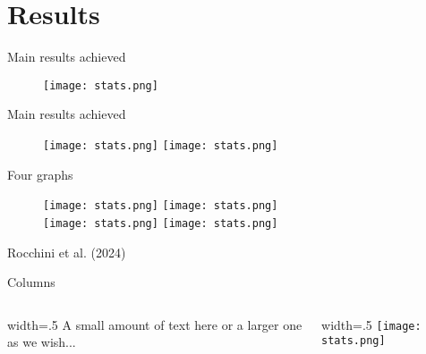 \documentclass{beamer}
\begin{document}
\section{Results}

\begin{frame}{Main results achieved}
    \begin{figure}
        \centering
        \texttt{[image: stats.png]}
        \label{fig:enter-label}
    \end{figure}
\end{frame}

\begin{frame}{Main results achieved}
    \begin{figure}
        \centering
        \texttt{[image: stats.png]}
        \texttt{[image: stats.png]}
    \end{figure}
\end{frame}

\begin{frame}{Four graphs}
    \begin{figure}
        \centering
        \texttt{[image: stats.png]}
        \texttt{[image: stats.png]} \\
        \texttt{[image: stats.png]}
        \texttt{[image: stats.png]} \\
    \end{figure}

\bigskip
\centering
\scriptsize{Rocchini et al. (2024)}
\end{frame}

\begin{frame}{Columns}
    \begin{columns}
        \begin{column}{width=.5\textwidth}
            A small amount of text  here or a larger one as we wish...
        \end{column}
        \begin{column}{width=.5\textwidth}
            \texttt{[image: stats.png]}
        \end{column}
    \end{columns}
\end{frame}
\end{document}
